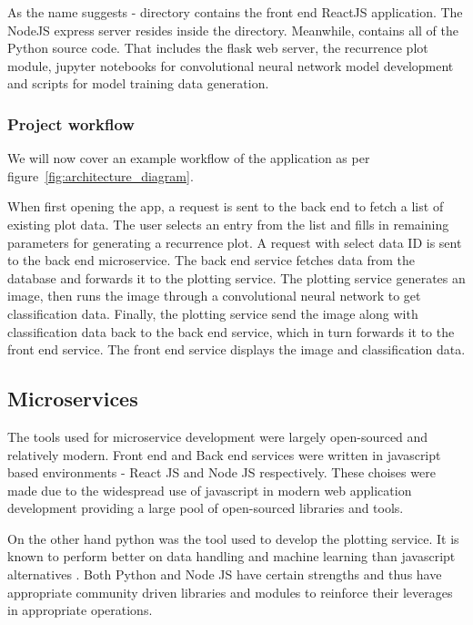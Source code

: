 \documentclass[a4paper,12pt,fleqn]{article}
\begin{document}
As the name suggests -  directory contains the front end ReactJS application.
The NodeJS express\cite{express} server resides inside the  directory.
Meanwhile,  contains all of the Python source code. That includes the flask \cite{flask} web server, the recurrence plot module, jupyter notebooks for convolutional neural network model development and scripts for model training data generation.


\subsubsection{Project workflow}
We will now cover an example workflow of the application as per figure~\ref{fig:architecture_diagram}.

When first opening the app, a request is sent to the back end to fetch a list of existing plot data. 
The user selects an entry from the list and fills in remaining parameters for generating a recurrence plot.
A request with select data ID is sent to the back end microservice.
The back end service fetches data from the database and forwards it to the plotting service.
The plotting service generates an image, then runs the image through a convolutional neural network to get classification data.
Finally, the plotting service send the image along with classification data back to the back end service, which in turn forwards it to the front end service.
The front end service displays the image and classification data.


\subsection{Microservices}
The tools used for microservice development were largely open-sourced and relatively modern. 
Front end and Back end services were written in javascript  
based environments - React JS and Node JS respectively.
These choises were made due to the widespread use of javascript in modern web application development providing a large pool of open-sourced libraries and tools.

On the other hand python was the tool used to develop the plotting service. It is known to perform better on data handling and machine learning than javascript alternatives \cite{javascript_vs_python_ml}.
Both Python and Node JS have certain strengths and thus have appropriate community driven libraries and modules to reinforce their leverages in appropriate operations.
\end{document}
